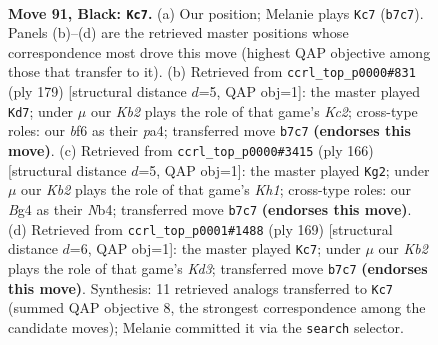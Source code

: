 \documentclass[11pt]{article}
\begin{document}
\clearpage

\begin{figure}[p]\centering
\begin{subfigure}{0.46\textwidth}\centering
\resizebox{\linewidth}{!}{%
\newchessgame
\chessboard[
  setfen={8/1k6/5B2/8/p1p3b1/8/5K2/1N6 b - - 37 91},
  showmover=false,
  pgfstyle=straightmove, color=movearrow, markmove={b7-c7}
]}
\caption{}
\end{subfigure}\hfill
\begin{subfigure}{0.46\textwidth}\centering
\resizebox{\linewidth}{!}{%
\newchessgame
\chessboard[
  setfen={8/2k5/8/p2K4/P7/3N4/4p3/8 b - - 47 90},
  showmover=false,
  pgfstyle=straightmove, color=movearrow, markmove={c7-d7}
]}
\caption{}
\end{subfigure}
\\[4pt]
\begin{subfigure}{0.46\textwidth}\centering
\resizebox{\linewidth}{!}{%
\newchessgame
\chessboard[
  setfen={8/4n3/4P3/6P1/1N6/8/4k3/7K w - - 5 84},
  showmover=false,
  pgfstyle=straightmove, color=movearrow, markmove={h1-g2}
]}
\caption{}
\end{subfigure}\hfill
\begin{subfigure}{0.46\textwidth}\centering
\resizebox{\linewidth}{!}{%
\newchessgame
\chessboard[
  setfen={8/8/3k4/1P5b/5p2/8/3K4/6B1 b - - 9 85},
  showmover=false,
  pgfstyle=straightmove, color=movearrow, markmove={d6-c7}
]}
\caption{}
\end{subfigure}
\caption{\textbf{Move 91, Black: \texttt{Kc7}.} (a) Our position; Melanie plays \texttt{Kc7} (\texttt{b7c7}). Panels (b)--(d) are the retrieved master positions whose correspondence most drove this move (highest QAP objective among those that transfer to it). (b) Retrieved from \texttt{ccrl\_top\_p0000\#831} (ply 179) [structural distance $d$=5, QAP obj=1]: the master played \texttt{Kd7}; under $\mu$ our \emph{Kb2} plays the role of that game's \emph{Kc2}; cross-type roles: our \emph{b}f6 as their \emph{p}a4; transferred move \texttt{b7c7} \textbf{(endorses this move)}. (c) Retrieved from \texttt{ccrl\_top\_p0000\#3415} (ply 166) [structural distance $d$=5, QAP obj=1]: the master played \texttt{Kg2}; under $\mu$ our \emph{Kb2} plays the role of that game's \emph{Kh1}; cross-type roles: our \emph{B}g4 as their \emph{N}b4; transferred move \texttt{b7c7} \textbf{(endorses this move)}. (d) Retrieved from \texttt{ccrl\_top\_p0001\#1488} (ply 169) [structural distance $d$=6, QAP obj=1]: the master played \texttt{Kc7}; under $\mu$ our \emph{Kb2} plays the role of that game's \emph{Kd3}; transferred move \texttt{b7c7} \textbf{(endorses this move)}. Synthesis: 11 retrieved analogs transferred to \texttt{Kc7} (summed QAP objective 8, the strongest correspondence among the candidate moves); Melanie committed it via the \texttt{search} selector.}
\label{fig:thought-m181}
\end{figure}
\end{document}
